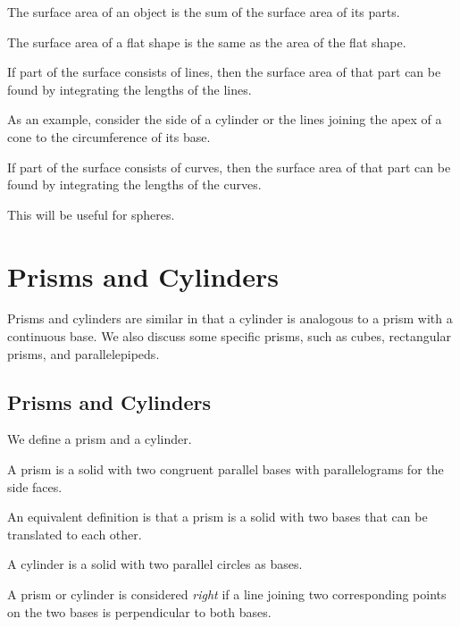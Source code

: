 \begin{fact}[Additivity]
The surface area of an object is the sum of the surface area of its parts.
\end{fact}

\begin{fact}
The surface area of a flat shape is the same as the area of the flat shape.
\end{fact}

\begin{fact}
If part of the surface consists of lines, then the surface area of that part can be found by integrating the lengths of the lines.
\end{fact}
As an example, consider the side of a cylinder or the lines joining the apex of a cone to the circumference of its base.

\begin{fact}[Curves]
If part of the surface consists of curves, then the surface area of that part can be found by integrating the lengths of the curves.
\end{fact}
This will be useful for spheres.

\section{Prisms and Cylinders}

Prisms and cylinders are similar in that a cylinder is analogous to a prism with a continuous base. We also discuss some specific prisms, such as cubes, rectangular prisms, and parallelepipeds.

\subsection{Prisms and Cylinders}
We define a prism and a cylinder.

\begin{defi}[Prism]
A prism is a solid with two congruent parallel bases with parallelograms for the side faces.
\end{defi}

An equivalent definition is that a prism is a solid with two bases that can be translated to each other.

\begin{defi}[Cylinder]
A cylinder is a solid with two parallel circles as bases.
\end{defi}

\begin{defi}
A prism or cylinder is considered \textit{right} if a line joining two corresponding points on the two bases is perpendicular to both bases.
\end{defi}

